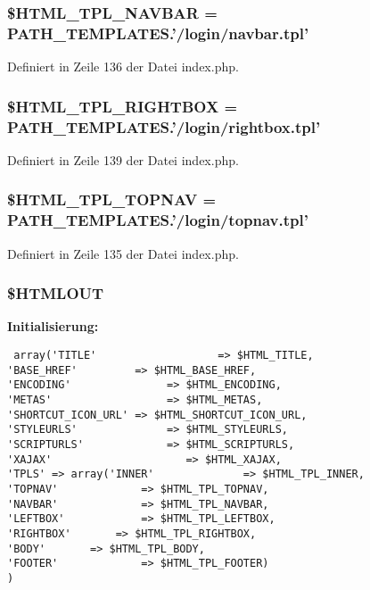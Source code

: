 \subsubsection{\setlength{\rightskip}{0pt plus 5cm}\$HTML\_\-TPL\_\-NAVBAR = PATH\_\-TEMPLATES.'/login/navbar.tpl'}\label{index_8php_18a0167b7206d323d1c8d556fcd07d8a}




Definiert in Zeile 136 der Datei index.php.
\subsubsection{\setlength{\rightskip}{0pt plus 5cm}\$HTML\_\-TPL\_\-RIGHTBOX = PATH\_\-TEMPLATES.'/login/rightbox.tpl'}\label{index_8php_24423772b2771eb9f4ef63f68843f0ae}




Definiert in Zeile 139 der Datei index.php.
\subsubsection{\setlength{\rightskip}{0pt plus 5cm}\$HTML\_\-TPL\_\-TOPNAV = PATH\_\-TEMPLATES.'/login/topnav.tpl'}\label{index_8php_8e2461f144a2c5abb2918ed49090845d}




Definiert in Zeile 135 der Datei index.php.
\subsubsection{\setlength{\rightskip}{0pt plus 5cm}\$HTMLOUT}\label{index_8php_82fec0cae9d257032edd8d9f6408f8a7}


\textbf{Initialisierung:}

\begin{Code}\begin{verbatim} array('TITLE'                   => $HTML_TITLE,
'BASE_HREF'         => $HTML_BASE_HREF,
'ENCODING'               => $HTML_ENCODING,
'METAS'                  => $HTML_METAS,
'SHORTCUT_ICON_URL' => $HTML_SHORTCUT_ICON_URL,
'STYLEURLS'              => $HTML_STYLEURLS,
'SCRIPTURLS'             => $HTML_SCRIPTURLS,
'XAJAX'                     => $HTML_XAJAX,
'TPLS' => array('INNER'              => $HTML_TPL_INNER,
'TOPNAV'             => $HTML_TPL_TOPNAV,
'NAVBAR'             => $HTML_TPL_NAVBAR,
'LEFTBOX'            => $HTML_TPL_LEFTBOX,
'RIGHTBOX'       => $HTML_TPL_RIGHTBOX,
'BODY'       => $HTML_TPL_BODY,
'FOOTER'             => $HTML_TPL_FOOTER)
)
\end{verbatim}
\end{Code}


